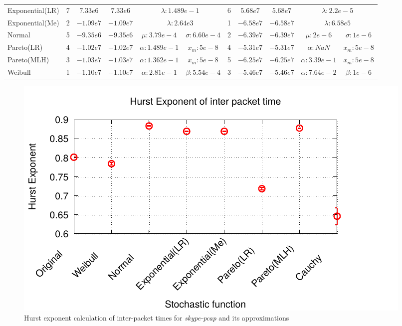 \begin{table}[ht!]
{\begin{tabular}{lcccccccccc}
			Exponential(LR) &	7 & $7.33e6$    & $7.33e6$   & \multicolumn{2}{c}{$\lambda:1.489e-1$}   
			&	6 & $5.68e7$    & $ 5.68e7$  & \multicolumn{2}{c}{$\lambda:2.2e-5$}   \\
			Exponential(Me) &	2 & $-1.09e7$   & $-1.09e7$  & \multicolumn{2}{c}{$\lambda:2.64e3$}   
			&	1 & $-6.58e7$   & $-6.58e7$  & \multicolumn{2}{c}{$\lambda:6.58e5$} \\
			Normal          &	5 & $-9.35e6$   & $-9.35e6$  & $\mu:3.79e-4$   &$\sigma:6.60e-4$ 
			&	2 & $-6.39e7$   & $-6.39e7$  & $\mu:2e-6$     & $\sigma:1e-6$ \\
			Pareto(LR)      &	4 & $-1.02e7$   & $-1.02e7$  & $\alpha:1.489e-1 $ & $x_m:5e-8 $    
			&	4 & $-5.31e7$   & $-5.31e7$  & $\alpha:NaN$ & $x_m:5e-8 $    \\
			Pareto(MLH)     &	3 & $-1.03e7$   & $-1.03e7$  & $\alpha:1.362e-1$ & $x_m:5e-8 $    
			&	5 & $-6.25e7$   & $-6.25e7$  & $\alpha:3.39e-1$ & $x_m:5e-8 $    \\
			Weibull         &	1 & $-1.10e7$   & $-1.10e7$  & $\alpha:2.81e-1$ & $\beta:5.54e-4$  
			&	3 & $-5.46e7$   & $-5.46e7$  & $\alpha:7.64e-2$ & $\beta:1e-6$  \\ \hline
		\end{tabular}
        }
	\label{tab:prototype-results}
\end{table}

\begin{figure}[ht!]
{\centering
\includegraphics[width=\columnwidth]{figures/Skype_Hurst_Exponent}
\caption{Hurst exponent calculation of inter-packet times for \textit{skype-pcap} and its approximations}
\label{fig:skype-hurst}\par}
\end{figure}

